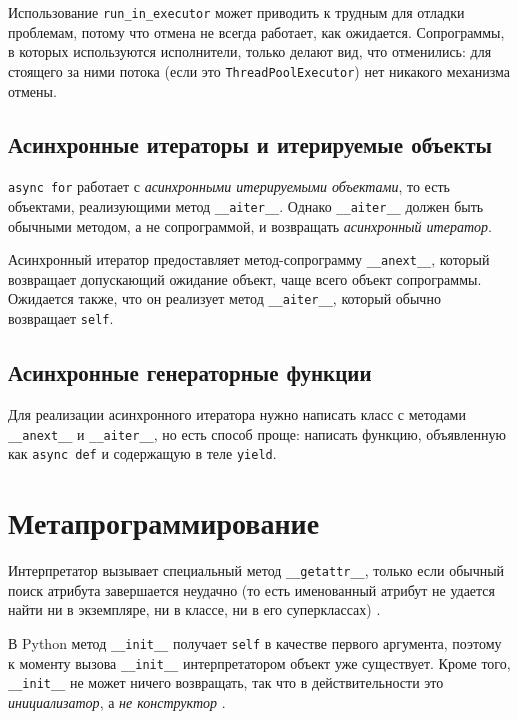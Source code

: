 \documentclass[%
	11pt,
	a4paper,
	utf8,
		]{article}
\begin{document}
Использование \verb*|run_in_executor| может приводить к трудным для отладки проблемам, потому что отмена не всегда работает, как ожидается. Сопрограммы, в которых используются исполнители, только делают вид, что отменились: для стоящего за ними потока (если это \verb|ThreadPoolExecutor|) нет никакого механизма отмены.

\subsection{Асинхронные итераторы и итерируемые объекты}

\verb*|async for| работает с \emph{асинхронными итерируемыми объектами}, то есть объектами, реализующими метод \verb|__aiter__|. Однако \verb*|__aiter__| должен быть обычными методом, а не сопрограммой, и возвращать \emph{асинхронный итератор}.

Асинхронный итератор предоставляет метод-сопрограмму \verb|__anext__|, который возвращает допускающий ожидание объект, чаще всего объект сопрограммы. Ожидается также, что он реализует метод \verb*|__aiter__|, который обычно возвращает \verb|self|. 

\subsection{Асинхронные генераторные функции}

Для реализации асинхронного итератора нужно написать класс с методами \verb*|__anext__| и \verb|__aiter__|, но есть способ проще: написать функцию, объявленную как \verb*|async def| и содержащую в теле \verb|yield|. 

\section{Метапрограммирование}

Интерпретатор вызывает специальный метод \verb*|__getattr__|, только если обычный поиск атрибута завершается неудачно (то есть именованный атрибут не удается найти ни в экземпляре, ни в классе, ни в его суперклассах) \cite[]{ramalho:python-2022}.

В Python метод \verb|__init__| получает \verb*|self| в качестве первого аргумента, поэтому к моменту вызова \verb|__init__| интерпретатором объект уже существует. Кроме того, \verb*|__init__| не может ничего возвращать, так что в действительности это \emph{инициализатор}, а \emph{не конструктор} \cite[]{ramalho:python-2022}. 
\end{document}
